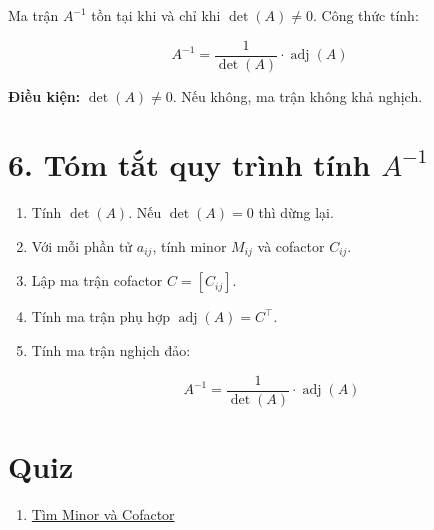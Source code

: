 \documentclass[12pt,a4paper]{article}
\begin{document}
Ma trận $A^{-1}$ tồn tại khi và chỉ khi $\det(A) \neq 0$. Công thức tính:

\[
A^{-1} = \frac{1}{\det(A)} \cdot \operatorname{adj}(A)
\]

\textbf{Điều kiện:} $\det(A) \ne 0$. Nếu không, ma trận không khả nghịch.

\section*{6. Tóm tắt quy trình tính $A^{-1}$}

\begin{enumerate}
    \item Tính $\det(A)$. Nếu $\det(A) = 0$ thì dừng lại.
    \item Với mỗi phần tử $a_{ij}$, tính minor $M_{ij}$ và cofactor $C_{ij}$.
    \item Lập ma trận cofactor $C = [C_{ij}]$.
    \item Tính ma trận phụ hợp $\operatorname{adj}(A) = C^\top$.
    \item Tính ma trận nghịch đảo:

    \[
    A^{-1} = \frac{1}{\det(A)} \cdot \operatorname{adj}(A)
    \]
\end{enumerate}

\section*{Quiz}
\begin{enumerate}
    \item \href{https://tratoa.github.io/MAE101/Minor%20And%20Cofactor.html}{Tìm Minor và Cofactor}
\end{enumerate}
\end{document}
